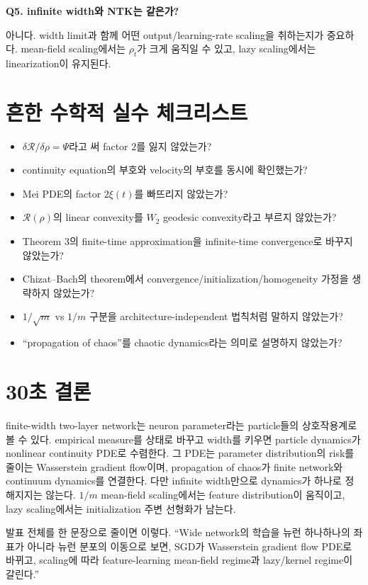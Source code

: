 \documentclass[11pt,a4paper,oneside,openany]{memoir}
\newcommand{\Risk}{\mathcal{R}}
\theoremstyle{definition}
\begin{document}
\textbf{Q5. infinite width와 NTK는 같은가?}

아니다. width limit과 함께 어떤 output/learning-rate scaling을 취하는지가 중요하다.
mean-field scaling에서는 $\rho_t$가 크게 움직일 수 있고, lazy scaling에서는 linearization이 유지된다.

\section{흔한 수학적 실수 체크리스트}

\begin{itemize}
  \item $\delta\Risk/\delta\rho=\Psi$라고 써 factor $2$를 잃지 않았는가?
  \item continuity equation의 부호와 velocity의 부호를 동시에 확인했는가?
  \item Mei PDE의 factor $2\xi(t)$를 빠뜨리지 않았는가?
  \item $\Risk(\rho)$의 linear convexity를 $W_2$ geodesic convexity라고 부르지 않았는가?
  \item Theorem 3의 finite-time approximation을 infinite-time convergence로 바꾸지 않았는가?
  \item Chizat--Bach의 theorem에서 convergence/initialization/homogeneity 가정을 생략하지 않았는가?
  \item $1/\sqrt m$ vs $1/m$ 구분을 architecture-independent 법칙처럼 말하지 않았는가?
  \item ``propagation of chaos''를 chaotic dynamics라는 의미로 설명하지 않았는가?
\end{itemize}

\section{30초 결론}

finite-width two-layer network는 neuron parameter라는 particle들의 상호작용계로 볼 수 있다.
empirical measure를 상태로 바꾸고 width를 키우면 particle dynamics가 nonlinear continuity PDE로 수렴한다.
그 PDE는 parameter distribution의 risk를 줄이는 Wasserstein gradient flow이며,
propagation of chaos가 finite network와 continuum dynamics를 연결한다.
다만 infinite width만으로 dynamics가 하나로 정해지지는 않는다. $1/m$ mean-field scaling에서는
feature distribution이 움직이고, lazy scaling에서는 initialization 주변 선형화가 남는다.

\begin{presentbox}
발표 전체를 한 문장으로 줄이면 이렇다. ``Wide network의 학습을 뉴런 하나하나의 좌표가 아니라
뉴런 분포의 이동으로 보면, SGD가 Wasserstein gradient flow PDE로 바뀌고, scaling에 따라
feature-learning mean-field regime과 lazy/kernel regime이 갈린다.''
\end{presentbox}
\end{document}
